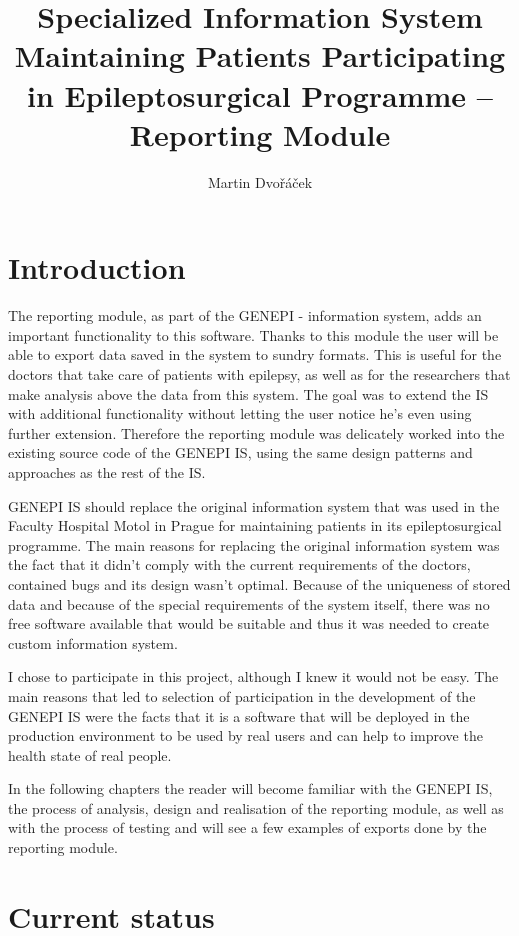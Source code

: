 \documentclass[thesis=B,english]{FITthesis}[2012/10/20]
\title{Specialized Information System Maintaining Patients Participating in Epileptosurgical Programme – Reporting Module}
\author{Martin Dvořáček} %
\begin{document}

\chapter{Introduction}
The reporting module, as part of the GENEPI - information system, adds an important functionality to this software. Thanks to this module the user will be able to export data saved in the system to sundry formats. This is useful for the doctors that take care of patients with epilepsy, as well as for the researchers that make analysis above the data from this system. The goal was to extend the IS with additional functionality without letting the user notice he's even using further extension. Therefore the reporting module was delicately worked into the existing source code of the GENEPI IS, using the same design patterns and approaches as the rest of the IS.

GENEPI IS should replace the original information system that was used in the Faculty Hospital Motol in Prague for maintaining patients in its epileptosurgical programme. The main reasons for replacing the original information system was the fact that it didn't comply with the current requirements of the doctors, contained bugs and its design wasn't optimal. Because of the uniqueness of stored data and because of the special requirements of the system itself, there was no free software available that would be suitable and thus it was needed to create custom information system.

I chose to participate in this project, although I knew it would not be easy. The main reasons that led to selection of participation in the development of the GENEPI IS were the facts that it is a software that will be deployed in the production environment to be used by real users and can help to improve the health state of real people. 

In the following chapters the reader will become familiar with the GENEPI IS, the process of analysis, design and realisation of the reporting module, as well as with the process of testing and will see a few examples of exports done by the reporting module.

\chapter{Current status}
\end{document}
